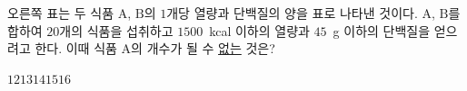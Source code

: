 \noindent\begin{minipage}[t]{0.58\linewidth}\vspace{0pt}\raggedright 오른쪽 표는 두 식품 $\mathrm{A}$, $\mathrm{B}$의 $1$개당 열량과 단백질의 양을 표로 나타낸 것이다. $\mathrm{A}$, $\mathrm{B}$를 합하여 $20$개의 식품을 섭취하고 $1500$~kcal 이하의 열량과 $45$~g 이하의 단백질을 얻으려고 한다. 이때 식품 $\mathrm{A}$의 개수가 될 수 \underline{없는} 것은?\end{minipage}\hfill\begin{minipage}[t]{0.4\linewidth}\vspace{0pt}\centering \resizebox{\ifdim\width>\linewidth\linewidth\else\width\fi}{!}{}\end{minipage}\par
\begin{choices32}{$12$}{$13$}{$14$}{$15$}{$16$}\end{choices32}
